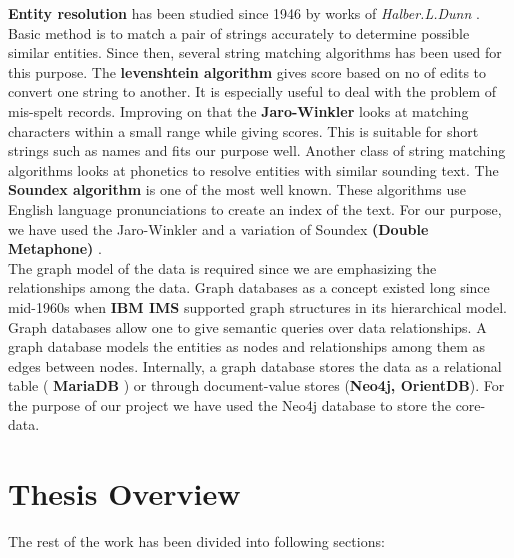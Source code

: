 \textbf{ Entity resolution } has been studied since 1946 by works of \emph{ Halber.L.Dunn }\cite{dunn}. Basic method is to match a pair of strings accurately to determine possible similar entities. Since then, several string matching algorithms has been used for this purpose. The \textbf{levenshtein algorithm} \cite{levenshtein} gives score based on no of edits to convert one string to another. It is especially useful to deal with the problem of mis-spelt records. Improving on that the \textbf{Jaro-Winkler} \cite{jwinkler} looks at matching characters within a small range while giving scores. This is suitable for short strings such as names and fits our purpose well. Another class of string matching algorithms looks at phonetics to resolve entities with similar sounding text. The \textbf{ Soundex algorithm }\cite{knuth} is one of the most well known. These algorithms use English language pronunciations to create an index of the text. For our purpose, we have used the Jaro-Winkler and a variation of Soundex \textbf{ (Double Metaphone) }\cite{philips}. \\

    The graph model of the data is required since we are emphasizing the relationships among the data. Graph databases as a concept existed long since mid-1960s when \textbf{ IBM IMS } \cite{korth} \cite{ims} supported graph structures in its hierarchical model. Graph databases allow one to give semantic queries  over data relationships. A graph database models the entities as nodes and relationships among them as edges between nodes. Internally, a graph database stores the data as a relational table (\textbf{ MariaDB }\cite{maria}) or through document-value stores (\textbf{Neo4j, OrientDB}\cite{neo}\cite{orient}). For the purpose of our project we have used the Neo4j database to store the core-data. 

\section{Thesis Overview}
The rest of the work has been divided into following sections:


